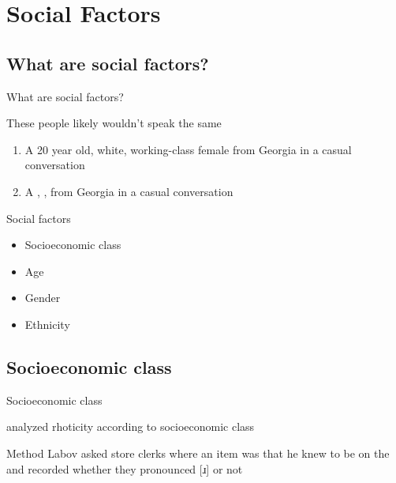\documentclass{beamer}
\subtitle[Social Factors]{Social Factors in Language Variation}
\newcommand{\suboneone}{What are social factors?}
\newcommand{\subonetwo}{Socioeconomic class}
\begin{document}
  

  \section{Social Factors}
    \subsection{\suboneone}
      \begin{frame}{\suboneone}
        \begin{block}{These people likely wouldn't speak the same}
          \begin{enumerate}
            \item A \alert<2>{20 year old}, \alert<4>{white}, \alert<1>{working-class} \alert<3>{female} from Georgia in a casual conversation
            \item A , ,   from Georgia in a casual conversation
          \end{enumerate}
        \end{block}
        \begin{block}{Social factors}
          \parbox{0.48\linewidth}{
            \begin{itemize}
              \item Socioeconomic class
              \item<2-> Age
              \item<3-> Gender
              \item<4-> Ethnicity
            \end{itemize}
          }
          \parbox{0.48\linewidth}{
          }
        \end{block}
      \end{frame}

    \subsection{\subonetwo}
      \begin{frame}{\subonetwo}
        \begin{definition}
          
        \end{definition}
        \begin{block}{\textcite{labov_social_2006} analyzed \alert{rhoticity} according to socioeconomic class}
          
        \end{block}
        \begin{block}{Method}
          Labov asked store clerks where an item was that he knew to be on the  and recorded whether they pronounced [ɹ] or not
        \end{block}
      \end{frame}
\end{document}
